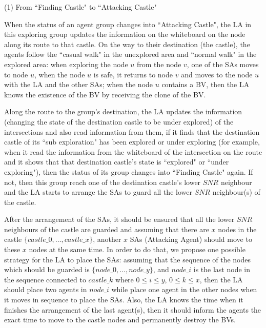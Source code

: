 (1) From ``Finding Castle" to ``Attacking Castle"

When the status of an agent group changes into ``Attacking Castle", the LA in this exploring group updates the information on the whiteboard on the node along its route to that castle. On the way to their destination (the castle), the agents follow the ``casual walk" in the unexplored area and ``normal walk" in the explored area: when exploring the node $u$ from the node $v$, one of the SAs moves to node $u$, when the node $u$ is safe, it returns to node $v$ and moves to the node $u$ with the LA and the other SAs; when the node $u$ contains a BV, then the LA knows the existence of the BV by receiving the clone of the BV.   

Along the route to the group's destination, the LA updates the information (changing the state of the destination castle to be under explored) of the intersections and also read information from them, if it finds that the destination castle of its ``sub exploration" has been explored or under exploring (for example, when it read the information from the whiteboard of the intersection on the route and it shows that that destination castle's state is ``explored" or ``under exploring"), then the status of its group changes into ``Finding Castle" again. If not, then this group reach one of the destination castle's lower $SNR$ neighbour and the LA starts to arrange the SAs to guard all the lower $SNR$ neighbour(s) of the castle. 

After the arrangement of the SAs, it should be ensured that all the lower $SNR$ neighbours of the castle are guarded and assuming that there are $x$ nodes in the castle $\{castle\_0, \ldots, castle\_x\}$, another $x$ SAs (Attacking Agent) should move to these $x$ nodes at the same time. In order to do that, we propose one possible strategy for the LA to place the SAs: assuming that the sequence of the nodes which should be guarded is $\{node\_0, \ldots, node\_y\}$, and $node\_i$ is the last node in the sequence connected to $castle\_k$ where $0\leq i\leq y$, $0\leq k\leq x$, then the LA should place two agents in $node\_i$ while place one agent in the other nodes when it moves in sequence to place the SAs. Also, the LA knows the time when it finishes the arrangement of the last agent(s), then it should inform the agents the exact time to move to the castle nodes and permanently destroy the BVs.

